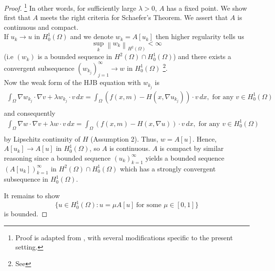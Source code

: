 \documentclass[11pt]{article}
\numberwithin{equation}{section}
\theoremstyle{definition}
\theoremstyle{remark}
\newcommand{\Honez}{H_0^1(\Omega)}
\newcommand{\norm}[1]{\left\lVert #1 \right\rVert}
\begin{document}
\begin{proof}
  \footnote{Proof is adapted from \cite[Section~9.2]{evans_pde}, with several modifications specific to the present setting.}
  In other words, for sufficiently large $\lambda >0$, $A$ has a fixed point. 
  We show first that $A$ meets the right criteria for Schaefer's Theorem. We assert that $A$ is continuous and
  compact.\\
  If $u_k \to u$ in $\Honez$ and we denote $w_k = A[u_k]$ then higher regularity tells us 
  \[\sup_k \norm{w_k}_{H^2(\Omega)} < \infty\]
  (i.e $(w_k)$ is a bounded sequence in $H^2(\Omega) \cap \Honez$) and there exists a convergent subsequence $(w_{k_j})_{j=1}^{\infty} \to w \text{ in } \Honez$ \footnote{See }.\\
  Now the weak form of the HJB equation with $w_{k_j}$ is
  \begin{align*}
    \int_\Omega \nabla w_{k_j}\cdot \nabla v + \lambda w_{k_j} \cdot v \,dx = \int_\Omega (f(x,m) - H(x,\nabla u_{k_j}))\cdot v \,dx, \text{ for any } v \in \Honez\\
  \end{align*}
  and consequently
  \begin{align*}
    \int_\Omega \nabla w\cdot \nabla v + \lambda w \cdot v \,dx = \int_\Omega (f(x,m) - H(x,\nabla u))\cdot v \,dx, \text{ for any } v \in \Honez\\
  \end{align*}
  by Lipschitz continuity of $H$ (Assumption 2).
  Thus, $w = A[u]$. Hence, $A[u_k] \to A[u]$ in $\Honez$, so $A$ is continuous. $A$ is compact by similar reasoning since 
  a bounded sequence $(u_k)_{k=1}^\infty$ yields a bounded sequence $(A[u_k])_{k=1}^\infty$ in $H^2(\Omega) \cap \Honez$ which has a strongly convergent subsequence in $\Honez$.

  It remains to show
  \[\{u\in \Honez: u=\mu A[u]\ \text{for some } \mu \in [0,1]\}\]
  is bounded.


\end{proof}
\end{document}
